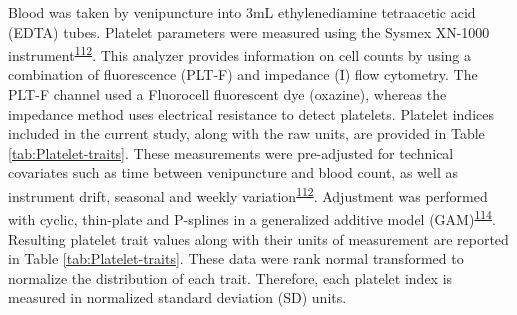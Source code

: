 \documentclass[11pt,twoside]{bristolthesis}
\begin{document}
Blood was taken by venipuncture into 3mL ethylenediamine tetraacetic acid (EDTA) tubes. Platelet parameters were measured using the Sysmex XN-1000 instrument\textsuperscript{\protect\hyperlink{ref-Astle2016}{112}}. This analyzer provides information on cell counts by using a combination of fluorescence (PLT-F) and impedance (I) flow cytometry. The PLT-F channel used a Fluorocell fluorescent dye (oxazine), whereas the impedance method uses electrical resistance to detect platelets. Platelet indices included in the current study, along with the raw units, are provided in Table \ref{tab:Platelet-traits}. These measurements were pre-adjusted for technical covariates such as time between venipuncture and blood count, as well as instrument drift, seasonal and weekly variation\textsuperscript{\protect\hyperlink{ref-Astle2016}{112}}. Adjustment was performed with cyclic, thin-plate and P-splines in a generalized additive model (GAM)\textsuperscript{\protect\hyperlink{ref-Akbari2020}{114}}. Resulting platelet trait values along with their units of measurement are reported in Table \ref{tab:Platelet-traits}. These data were rank normal transformed to normalize the distribution of each trait. Therefore, each platelet index is measured in normalized standard deviation (SD) units.
\end{document}
